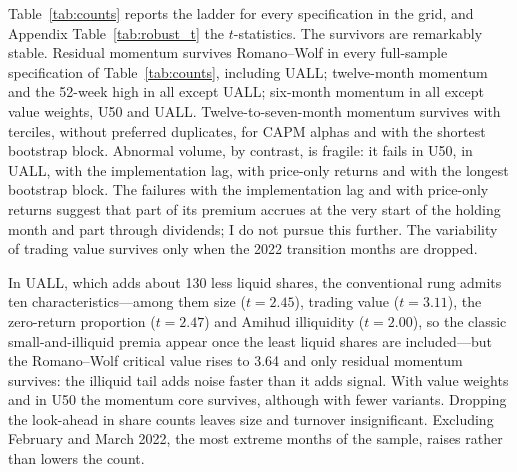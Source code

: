 \documentclass[11pt]{article}
\newcommand{\RW}{Romano--Wolf}
\begin{document}
Table~\ref{tab:counts} reports the ladder for every specification in the grid, and Appendix Table~\ref{tab:robust_t}
the $t$-statistics. The survivors are remarkably stable. Residual momentum survives \RW{} in every full-sample specification
of Table~\ref{tab:counts}, including UALL; twelve-month momentum and the 52-week high in all except UALL; six-month
momentum in all except value weights, U50 and UALL. Twelve-to-seven-month momentum survives with terciles, without
preferred duplicates, for CAPM alphas and with the shortest bootstrap block. Abnormal volume, by contrast, is fragile: it fails in U50, in UALL, with the
implementation lag, with price-only returns and with the longest bootstrap block. The failures with the implementation lag and with price-only returns suggest that part of its premium accrues at the very
start of the holding month and part through dividends; I do not pursue this further. The variability of trading value survives only when the 2022 transition
months are dropped.

In UALL, which adds about 130 less liquid shares, the conventional rung admits ten characteristics---among them
size ($t=2.45$), trading value ($t=3.11$), the zero-return proportion ($t=2.47$) and Amihud illiquidity
($t=2.00$), so the classic small-and-illiquid premia appear once the least liquid shares are included---but the
\RW{} critical value rises to 3.64 and only residual momentum survives: the illiquid tail adds noise faster than it
adds signal. With value weights and in U50 the momentum core survives, although with fewer variants. Dropping the
look-ahead in share counts leaves size and turnover insignificant. Excluding February and March 2022, the most extreme
months of the sample, raises rather than lowers the count.
\end{document}
